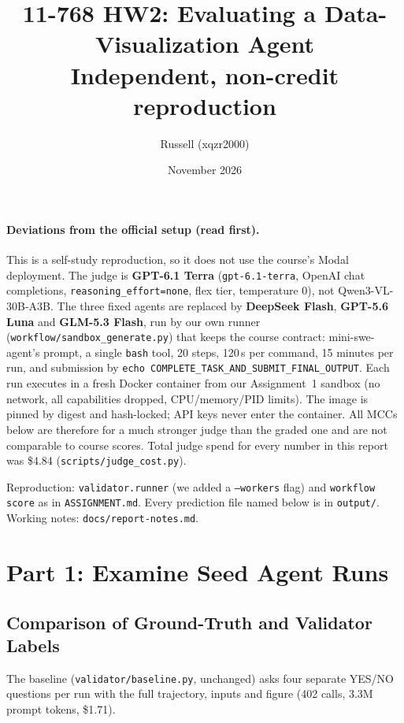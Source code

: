 \documentclass[11pt]{article}
\title{11-768 HW2: Evaluating a Data-Visualization Agent\\
\large Independent, non-credit reproduction}
\author{Russell (xqzr2000)}
\date{November 2026}
\begin{document}
\sloppy
\maketitle

\paragraph{Deviations from the official setup (read first).}
This is a self-study reproduction, so it does not use the course's Modal
deployment. The judge is \textbf{GPT-6.1 Terra} (\texttt{gpt-6.1-terra}, OpenAI
chat completions, \texttt{reasoning\_effort=none}, flex tier, temperature 0),
not Qwen3-VL-30B-A3B. The three fixed agents are replaced by
\textbf{DeepSeek Flash}, \textbf{GPT-5.6 Luna} and \textbf{GLM-5.3 Flash}, run by
our own runner (\texttt{workflow/sandbox\_generate.py}) that keeps the course
contract: mini-swe-agent's prompt, a single \texttt{bash} tool, 20 steps, 120\,s
per command, 15 minutes per run, and submission by
\texttt{echo COMPLETE\_TASK\_AND\_SUBMIT\_FINAL\_OUTPUT}. Each run executes in a
fresh Docker container from our Assignment~1 sandbox (no network, all
capabilities dropped, CPU/memory/PID limits). The image is pinned by digest and
hash-locked; API keys never enter the container. All MCCs below are therefore
for a much stronger judge than the graded one and are not comparable to course
scores. Total judge spend for every number in this report was \$4.84
(\texttt{scripts/judge\_cost.py}).

Reproduction: \texttt{validator.runner} (we added a \texttt{--workers} flag) and
\texttt{workflow score} as in \texttt{ASSIGNMENT.md}. Every prediction file named
below is in \texttt{output/}. Working notes: \texttt{docs/report-notes.md}.

\section{Part 1: Examine Seed Agent Runs}

\subsection{Comparison of Ground-Truth and Validator Labels}
The baseline (\texttt{validator/baseline.py}, unchanged) asks four separate
YES/NO questions per run with the full trajectory, inputs and figure
(402 calls, 3.3M prompt tokens, \$1.71).
\end{document}
